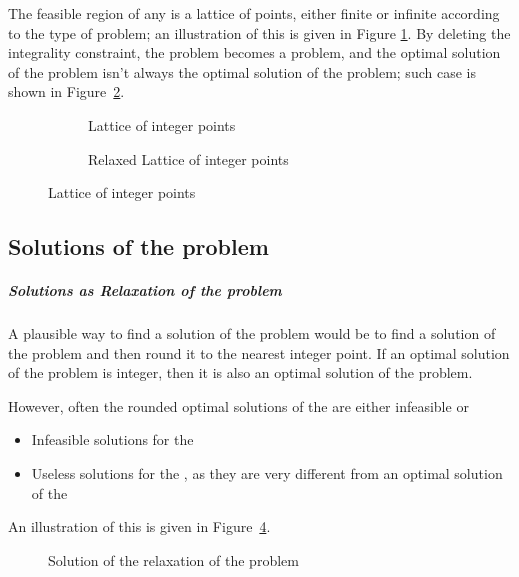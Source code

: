 \documentclass[english]{article}
\begin{document}
\bigskip
The feasible region of any \ILP is a lattice of points, either finite or infinite according to the type of problem;
an illustration of this is given in Figure \ref{subfig:integer-lattice}.
By deleting the integrality constraint, the \ILP problem becomes a \LP problem, and the optimal solution of the \ILP problem isn't always the optimal solution of the \LP problem; such case is shown in Figure~\ref{subfig:integer-lattice-relaxed}.

\begin{figure}[htbp]
  \centering
  \bigskip
  \begin{subfigure}[b]{0.495\textwidth}
    \centering
    \caption{Lattice of integer points}
    \label{subfig:integer-lattice}
  \end{subfigure}
  \begin{subfigure}[b]{0.495\textwidth}
    \centering
    \caption{Relaxed Lattice of integer points}
    \label{subfig:integer-lattice-relaxed}
  \end{subfigure}
  \caption{Lattice of integer points}
  \label{fig:integer-lattice}
  \bigskip
\end{figure}

\subsection{Solutions of the \ILP problem}

\subparagraph*{Solutions as Relaxation of the \LP problem}
A plausible way to find a solution of the \ILP problem would be to find a solution of the \LP problem and then round it to the nearest integer point.
If an optimal solution of the \LP problem is integer, then it is also an optimal solution of the \ILP problem.

However, often the rounded optimal solutions of the \LP are either infeasible or

\begin{itemize}
  \item Infeasible solutions for the \ILP
  \item Useless solutions for the \ILP, as they are very different from an optimal solution of the \ILP
\end{itemize}

An illustration of this is given in Figure~\ref{fig:solution-relaxation-ilp}.

\begin{figure}[htbp]
  \centering
  \bigskip
  \caption{Solution of the \LP relaxation of the \ILP problem}
  \label{fig:solution-relaxation-ilp}
  \bigskip
\end{figure}
\end{document}
